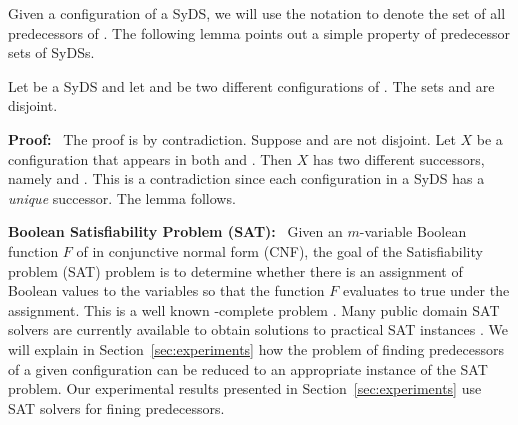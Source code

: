 Given a configuration \calc{} of a SyDS, we will use the notation \predset{\calc}{}
to denote the set of all predecessors of \calc.
The following lemma points out a simple property of predecessor sets
of SyDSs.

\begin{lemma}\label{lem:disjoint_pred}
Let \cals{} be a SyDS and let \calcone{} and \calctwo{} be two different
configurations of \cals.
The sets \predset{\calcone}{} and \predset{\calctwo}{} are disjoint.
\end{lemma}

\noindent
\textbf{Proof:}~ The proof is by contradiction.
Suppose \predset{\calcone}{} and \predset{\calctwo}{} are not disjoint.
Let $X$ be a configuration that appears in both
\predset{\calcone}{} and \predset{\calctwo}.
Then $X$ has two different successors, namely \calcone{} and \calctwo.
This is a contradiction since each configuration in a SyDS has a \emph{unique}
successor. The lemma follows. \QED

\smallskip

\noindent
\textbf{Boolean Satisfiability Problem (SAT):}~ Given an $m$-variable Boolean 
function $F$ of in conjunctive normal form (CNF), the goal of the 
Satisfiability problem (SAT) problem is to determine whether there is an assignment
of Boolean values to the variables so that the function $F$ evaluates to true
under the assignment.
This is a well known \cnp-complete problem \cite{GJ-1979}.
Many public domain SAT solvers are currently available to obtain solutions
to practical SAT instances \cite{sat-live}.
We will explain in Section~\ref{sec:experiments} how the problem of finding
predecessors of a given configuration can be reduced to an appropriate 
instance of the SAT problem.
Our experimental results presented in Section~\ref{sec:experiments}
use SAT solvers for fining predecessors.

